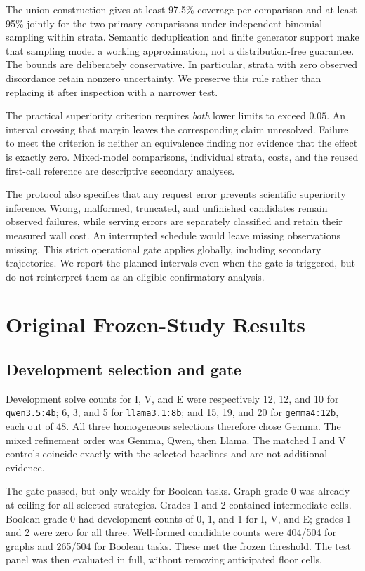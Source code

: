 The union construction gives at least 97.5\% coverage per comparison and at least 95\% jointly for the two primary comparisons under independent binomial sampling within strata. Semantic deduplication and finite generator support make that sampling model a working approximation, not a distribution-free guarantee. The bounds are deliberately conservative. In particular, strata with zero observed discordance retain nonzero uncertainty. We preserve this rule rather than replacing it after inspection with a narrower test.

The practical superiority criterion requires \emph{both} lower limits to exceed $0.05$. An interval crossing that margin leaves the corresponding claim unresolved. Failure to meet the criterion is neither an equivalence finding nor evidence that the effect is exactly zero. Mixed-model comparisons, individual strata, costs, and the reused first-call reference are descriptive secondary analyses.

The protocol also specifies that any request error prevents scientific superiority inference. Wrong, malformed, truncated, and unfinished candidates remain observed failures, while serving errors are separately classified and retain their measured wall cost. An interrupted schedule would leave missing observations missing. This strict operational gate applies globally, including secondary trajectories. We report the planned intervals even when the gate is triggered, but do not reinterpret them as an eligible confirmatory analysis.

\section{Original Frozen-Study Results}
\label{sec:results}

\subsection{Development selection and gate}

Development solve counts for I, V, and E were respectively 12, 12, and 10 for \texttt{qwen3.5:4b}; 6, 3, and 5 for \texttt{llama3.1:8b}; and 15, 19, and 20 for \texttt{gemma4:12b}, each out of 48. All three homogeneous selections therefore chose Gemma. The mixed refinement order was Gemma, Qwen, then Llama. The matched I and V controls coincide exactly with the selected baselines and are not additional evidence.

The gate passed, but only weakly for Boolean tasks. Graph grade 0 was already at ceiling for all selected strategies. Grades 1 and 2 contained intermediate cells. Boolean grade 0 had development counts of 0, 1, and 1 for I, V, and E; grades 1 and 2 were zero for all three. Well-formed candidate counts were 404/504 for graphs and 265/504 for Boolean tasks. These met the frozen threshold. The test panel was then evaluated in full, without removing anticipated floor cells.


